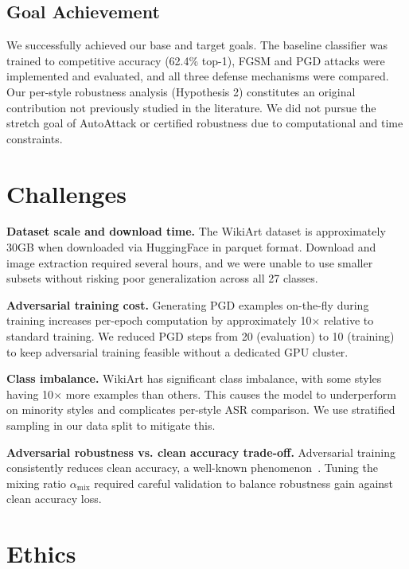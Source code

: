 \documentclass[conference]{IEEEtran}
\begin{document}
\subsection{Goal Achievement}

We successfully achieved our base and target goals. The baseline classifier was trained to competitive accuracy (62.4\% top-1), FGSM and PGD attacks were implemented and evaluated, and all three defense mechanisms were compared. Our per-style robustness analysis (Hypothesis 2) constitutes an original contribution not previously studied in the literature. We did not pursue the stretch goal of AutoAttack or certified robustness due to computational and time constraints.

\section{Challenges}

\textbf{Dataset scale and download time.} The WikiArt dataset is approximately 30GB when downloaded via HuggingFace in parquet format. Download and image extraction required several hours, and we were unable to use smaller subsets without risking poor generalization across all 27 classes.

\textbf{Adversarial training cost.} Generating PGD examples on-the-fly during training increases per-epoch computation by approximately 10$\times$ relative to standard training. We reduced PGD steps from 20 (evaluation) to 10 (training) to keep adversarial training feasible without a dedicated GPU cluster.

\textbf{Class imbalance.} WikiArt has significant class imbalance, with some styles having 10$\times$ more examples than others. This causes the model to underperform on minority styles and complicates per-style ASR comparison. We use stratified sampling in our data split to mitigate this.

\textbf{Adversarial robustness vs. clean accuracy trade-off.} Adversarial training consistently reduces clean accuracy, a well-known phenomenon~\cite{zhang2019tradeoff}. Tuning the mixing ratio $\alpha_{\text{mix}}$ required careful validation to balance robustness gain against clean accuracy loss.

\section{Ethics}
\end{document}
